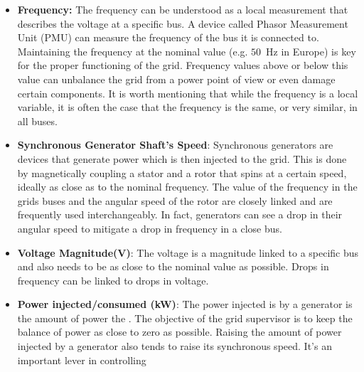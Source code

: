 \documentclass{article}
\begin{document}
\begin{itemize}
    \item \textbf{Frequency:} The frequency can be understood as a local measurement that describes the voltage at a specific bus. A device called Phasor Measurement Unit (PMU) can measure the frequency of the bus it is connected to. Maintaining the frequency at the nominal value (e.g. $50$~Hz in Europe) is key for the proper functioning of the grid. Frequency values above or below this value can unbalance the grid from a power point of view or even damage certain components. It is worth mentioning that while the frequency is a local variable, it is often the case that the frequency is the same, or very similar, in all buses.   
    \item \textbf{Synchronous Generator Shaft's Speed}: Synchronous generators are devices that generate power which is then injected to the grid. This is done by magnetically coupling a stator and a rotor that spins at a certain speed, ideally as close as to the nominal frequency. The value of the frequency in the grids buses and the angular speed of the rotor are closely linked and are frequently used interchangeably. In fact, generators can see a drop in their angular speed to mitigate a drop in frequency in a close bus.
    \item \textbf{Voltage Magnitude(V)}: The voltage is a magnitude linked to a specific bus and also needs to be as close to the nominal value as possible. Drops in frequency can be linked to drops in voltage.
    \item \textbf{Power injected/consumed (kW)}: The power injected is by a generator is the amount of power the . The objective of the grid supervisor is to keep the balance of power as close to zero as possible. Raising the amount of power injected by a generator also tends to raise its synchronous speed. It's an important lever in controlling  
\end{itemize}

\end{document}
